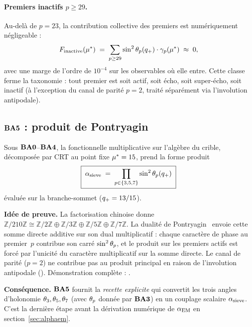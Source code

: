 \paragraph{Premiers inactifs $p \geq 29$.}
Au-delà de $p = 23$, la contribution collective des premiers est numériquement négligeable :
\[
F_{\rm inactive}(\mu^{*}) \;=\; \sum_{p \geq 29} \sin^{2}\theta_{p}(q_{+}) \cdot \gamma_{p}(\mu^{*}) \;\approx\; 0,
\]
avec une marge de l'ordre de $10^{-4}$ sur les observables où elle entre. Cette classe ferme la taxonomie : tout premier est soit actif, soit écho, soit super-écho, soit inactif (à l'exception du canal de parité $p = 2$, traité séparément via l'involution antipodale).

\subsection{\texorpdfstring{$\textbf{BA5}$}{BA5} : produit de Pontryagin}
\label{sec:bridge:BA5}

\begin{theoreme}
\label{thm:BA5}
Sous $\textbf{BA0}$--$\textbf{BA4}$, la fonctionnelle multiplicative sur l'algèbre du crible, décomposée par CRT au point fixe $\mu^{*} = 15$, prend la forme produit
\[
\boxed{\;
\alpha_{\rm sieve} \;=\; \prod_{p \in \{3,5,7\}} \sin^{2}\theta_{p}(q_{+}) \;}
\]
évaluée sur la branche-sommet ($q_{+} = 13/15$).
\end{theoreme}

\textbf{Idée de preuve.} La factorisation chinoise donne $\mathbb{Z}/210\mathbb{Z} \cong \mathbb{Z}/2\mathbb{Z} \oplus \mathbb{Z}/3\mathbb{Z} \oplus \mathbb{Z}/5\mathbb{Z} \oplus \mathbb{Z}/7\mathbb{Z}$. La dualité de Pontryagin~\cite{Wilson1983,Peskin1995} envoie cette somme directe additive sur son dual multiplicatif : chaque caractère de phase au premier~$p$ contribue son carré $\sin^{2}\theta_{p}$, et le produit sur les premiers actifs est forcé par l'unicité du caractère multiplicatif sur la somme directe. Le canal de parité ($p = 2$) ne contribue pas au produit principal en raison de l'involution antipodale (\Tthree). Démonstration complète : \cite[ch.~09, Thm.~Pontryagin]{PT_Monograph}.

\textbf{Conséquence.} $\textbf{BA5}$ fournit la \emph{recette explicite} qui convertit les trois angles d'holonomie $\theta_{3}, \theta_{5}, \theta_{7}$ (avec $\theta_{p}$ donnée par $\textbf{BA3}$) en un couplage scalaire $\alpha_{\rm sieve}$. C'est la dernière étape avant la dérivation numérique de $\alpha_{\rm EM}$ en section~\ref{sec:alphaem}.

